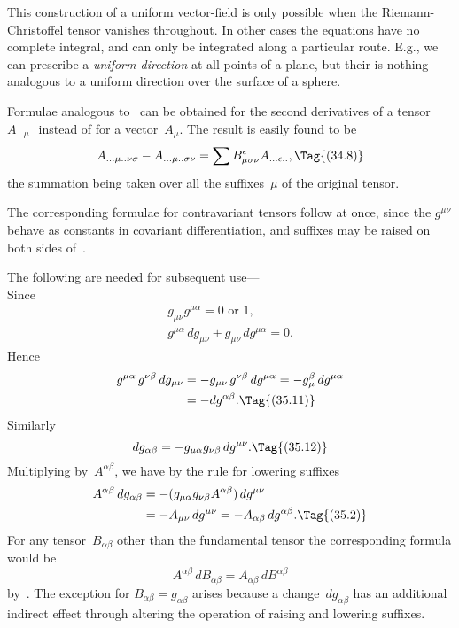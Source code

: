 \documentclass[12pt]{book}
\begin{document}
This construction of a uniform vector\hyp{}field is only possible when the
Riemann\hyp{}Christoffel tensor vanishes throughout. In other cases the equations
have no complete integral, and can only be integrated along a particular route.
E.g., we can prescribe a \emph{uniform direction} at all points of a plane, but their is
nothing analogous to a uniform direction over the surface of a sphere.

Formulae analogous to~ can be obtained for the second derivatives
of a tensor~$A_{...\mu..}$ instead of for a vector~$A_{\mu}$. The result is easily found to be
\[
A_{...\mu..\nu\sigma} - A_{...\mu..\sigma\nu} = \sum B_{\mu\sigma\nu}^{\epsilon} A_{...\epsilon..},
\Tag{(34.8)}
\]
the summation being taken over all the suffixes~$\mu$ of the original tensor.

The corresponding formulae for contravariant tensors follow at once, since
the $g^{\mu\nu}$ behave as constants in covariant differentiation, and suffixes may be
raised on both sides of~.


The following are needed for subsequent use--- \\
Since
\begin{gather*}
g_{\mu\nu} g^{\mu\alpha} = \text{$0$ or $1$,} \\
g^{\mu\alpha} \, dg_{\mu\nu} + g_{\mu\nu}\, dg^{\mu\alpha} = 0.
\end{gather*}
Hence
\begin{align*}
  g^{\mu\alpha}\, g^{\nu\beta} \, dg_{\mu\nu}
  &= -g_{\mu\nu}\, g^{\nu\beta}\, dg^{\mu\alpha}
   = -g_{\mu}^{\beta}\, dg^{\mu\alpha} \\
  &= -dg^{\alpha\beta}.
  \Tag{(35.11)}
\end{align*}
Similarly
\[
dg_{\alpha\beta} = -g_{\mu\alpha} g_{\nu\beta}\, dg^{\mu\nu}.
\Tag{(35.12)}
\]
Multiplying by~$A^{\alpha\beta}$, we have by the rule for lowering suffixes
\begin{align*}
  A^{\alpha\beta}\, dg_{\alpha\beta}
  &= -(g_{\mu\alpha} g_{\nu\beta}A^{\alpha\beta})\, dg^{\mu\nu} \\
  &= -A_{\mu\nu}\, dg^{\mu\nu}
   = -A_{\alpha\beta}\, dg^{\alpha\beta}.
  \Tag{(35.2)}
\end{align*}
For any tensor~$B_{\alpha\beta}$ other than the fundamental tensor the corresponding
formula would be
\[
A^{\alpha\beta}\, dB_{\alpha\beta} = A_{\alpha\beta}\, dB^{\alpha\beta}
\]
by~. The exception for $B_{\alpha\beta} = g_{\alpha\beta}$ arises because a change~$dg_{\alpha\beta}$ has an
additional indirect effect through altering the operation of raising and lowering
suffixes.
\end{document}
